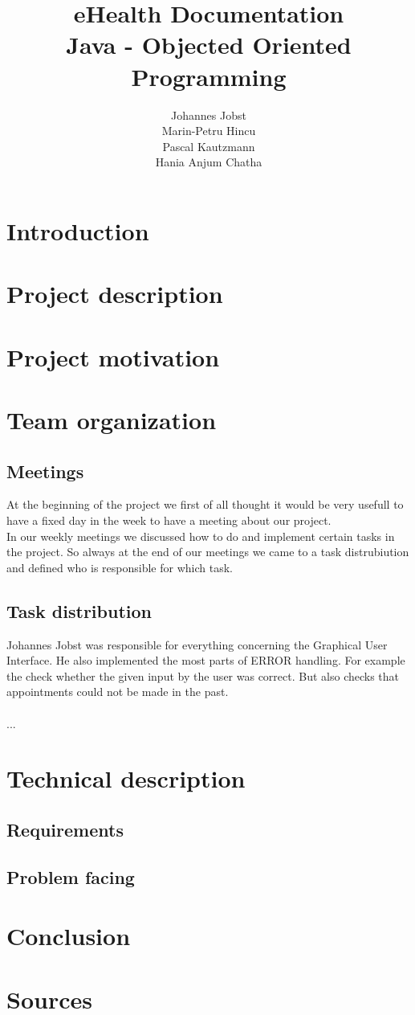 \documentclass[a4paper, 12pt]{report}
\title{\textbf{eHealth Documentation}\\Java - Objected Oriented Programming}
\author{Johannes Jobst\\Marin-Petru Hincu\\Pascal Kautzmann\\Hania Anjum Chatha}
\begin{document}
\maketitle


\tableofcontents

\chapter{Introduction}

\chapter{Project description}

\chapter{Project motivation}

\chapter{Team organization}
\section{Meetings}
At the beginning of the project we first of all thought it would be very usefull 
to have a fixed day in the week to have a meeting about our project. \\
In our weekly meetings we discussed how to do and implement certain tasks in the project.
So always at the end of our meetings we came to a task distrubiution and defined who is
responsible for which task. 
\section{Task distribution}

Johannes Jobst was responsible for everything concerning the Graphical User Interface.
He also implemented the most parts of ERROR handling. For example the check whether the given
input by the user was correct. But also checks that appointments could not be made in the past. \\ \\
...

\chapter{Technical description}
\section{Requirements}

\section{Problem facing}

\chapter{Conclusion}

\chapter{Sources}
\end{document}

